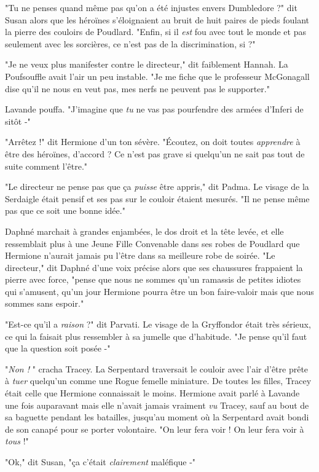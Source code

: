 "Tu ne penses quand même pas qu'on a été injustes envers Dumbledore ?" dit Susan alors que les héroïnes s'éloignaient au bruit de huit paires de pieds foulant la pierre des couloirs de Poudlard. "Enfin, si il \emph{est}  fou avec tout le monde et pas seulement avec les sorcières, ce n'est pas de la discrimination, si ?"

"Je ne veux plus manifester contre le directeur," dit faiblement Hannah. La Poufsouffle avait l'air un peu instable. "Je me fiche que le professeur McGonagall dise qu'il ne nous en veut pas, mes nerfs ne peuvent pas le supporter."

Lavande pouffa. "J'imagine que \emph{tu}  ne vas pas pourfendre des armées d'Inferi de sitôt -"

"Arrêtez !" dit Hermione d'un ton sévère. "Écoutez, on doit toutes \emph{apprendre}  à être des héroïnes, d'accord ? Ce n'est pas grave si quelqu'un ne sait pas tout de suite comment l'être."

"Le directeur ne pense pas que ça \emph{puisse}  être appris," dit Padma. Le visage de la Serdaigle était pensif et ses pas sur le couloir étaient mesurés. "Il ne pense même pas que ce soit une bonne idée."

Daphné marchait à grandes enjambées, le dos droit et la tête levée, et elle ressemblait plus à une Jeune Fille Convenable dans ses robes de Poudlard que Hermione n'aurait jamais pu l'être dans sa meilleure robe de soirée. "Le directeur," dit Daphné d'une voix précise alors que ses chaussures frappaient la pierre avec force, "pense que nous ne sommes qu'un ramassis de petites idiotes qui s'amusent, qu'un jour Hermione pourra être un bon faire-valoir mais que nous sommes sans espoir."

"Est-ce qu'il a \emph{raison}  ?" dit Parvati. Le visage de la Gryffondor était très sérieux, ce qui la faisait plus ressembler à sa jumelle que d'habitude. "Je pense qu'il faut que la question soit posée -"

"\emph{Non !} " cracha Tracey. La Serpentard traversait le couloir avec l'air d'être prête à \emph{tuer}  quelqu'un comme une Rogue femelle miniature. De toutes les filles, Tracey était celle que Hermione connaissait le moins. Hermione avait parlé à Lavande une fois auparavant mais elle n'avait jamais vraiment \emph{vu}  Tracey, sauf au bout de sa baguette pendant les batailles, jusqu'au moment où la Serpentard avait bondi de son canapé pour se porter volontaire. "On leur fera voir ! On leur fera voir à \emph{tous}  !"

"Ok," dit Susan, "ça c'était \emph{clairement}  maléfique -"

